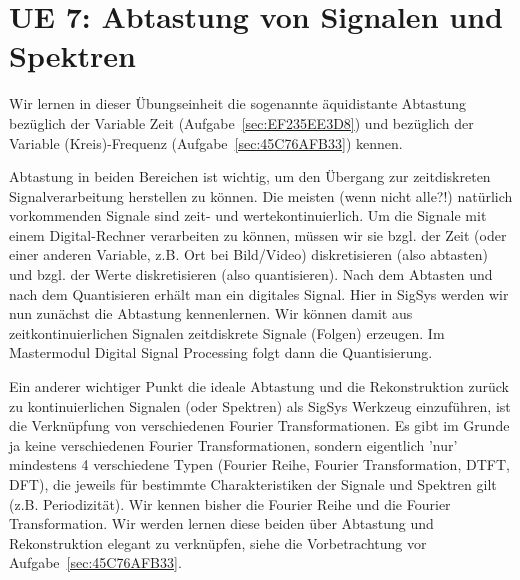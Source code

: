 \clearpage
\section{UE 7: Abtastung von Signalen und Spektren}
\label{sec:ue7_abtastung}

Wir lernen in dieser Übungseinheit die sogenannte äquidistante Abtastung bezüglich
der Variable Zeit (Aufgabe~\ref{sec:EF235EE3D8}) und bezüglich
der Variable (Kreis)-Frequenz (Aufgabe~\ref{sec:45C76AFB33}) kennen.
%

Abtastung in beiden Bereichen ist wichtig, um den Übergang zur zeitdiskreten
Signalverarbeitung herstellen zu können.
%
Die meisten (wenn nicht alle?!) natürlich vorkommenden Signale sind zeit- und
wertekontinuierlich.
%
Um die Signale mit einem Digital-Rechner verarbeiten zu können, müssen wir sie bzgl. der
Zeit (oder einer anderen Variable, z.B. Ort bei Bild/Video)
diskretisieren (also abtasten) und bzgl. der Werte diskretisieren
(also quantisieren).
%
Nach dem Abtasten und nach dem Quantisieren erhält man ein digitales Signal.
%
Hier in SigSys werden wir nun zunächst die Abtastung kennenlernen. Wir können damit
aus zeitkontinuierlichen Signalen zeitdiskrete Signale (Folgen) erzeugen.
Im Mastermodul Digital Signal Processing folgt dann die Quantisierung.
%

Ein anderer wichtiger Punkt die ideale Abtastung und die Rekonstruktion zurück
zu kontinuierlichen Signalen (oder Spektren) als SigSys Werkzeug einzuführen, ist
die Verknüpfung von verschiedenen Fourier Transformationen.
%
Es gibt im Grunde ja keine verschiedenen Fourier Transformationen, sondern
eigentlich 'nur' mindestens 4 verschiedene Typen
(Fourier Reihe, Fourier Transformation, DTFT, DFT), die jeweils für bestimmte
Charakteristiken der Signale und Spektren gilt (z.B. Periodizität).
%
Wir kennen bisher die Fourier Reihe und die Fourier Transformation.
%
Wir werden lernen diese beiden über Abtastung und Rekonstruktion elegant zu
verknüpfen, siehe die Vorbetrachtung vor Aufgabe~\ref{sec:45C76AFB33}.

